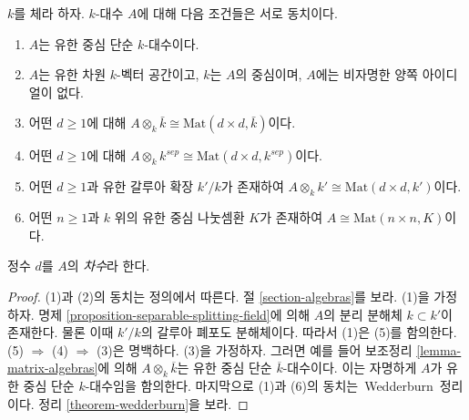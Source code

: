 \begin{lemma}
\label{lemma-finite-central-simple-algebra}
$k$를 체라 하자. $k$-대수 $A$에 대해 다음 조건들은 서로 동치이다.
\begin{enumerate}
\item $A$는 유한 중심 단순 $k$-대수이다.
\item $A$는 유한 차원 $k$-벡터 공간이고, $k$는 $A$의 중심이며,
$A$에는 비자명한 양쪽 아이디얼이 없다.
\item 어떤 $d \geq 1$에 대해
$A \otimes_k \bar k \cong \text{Mat}(d \times d, \bar k)$이다.
\item 어떤 $d \geq 1$에 대해
$A \otimes_k k^{sep} \cong \text{Mat}(d \times d, k^{sep})$이다.
\item 어떤 $d \geq 1$과 유한 갈루아 확장 $k'/k$가 존재하여
$A \otimes_k k' \cong \text{Mat}(d \times d, k')$이다.
\item 어떤 $n \geq 1$과 $k$ 위의 유한 중심 나눗셈환 $K$가 존재하여
$A \cong \text{Mat}(n \times n, K)$이다.
\end{enumerate}
정수 $d$를 $A$의 {\it 차수}라 한다.
\end{lemma}

\begin{proof}
(1)과 (2)의 동치는 정의에서 따른다. 절 \ref{section-algebras}를 보라.
(1)을 가정하자. 명제 \ref{proposition-separable-splitting-field}에 의해
$A$의 분리 분해체 $k \subset k'$이 존재한다. 물론 이때 $k'/k$의
갈루아 폐포도 분해체이다. 따라서 (1)은 (5)를 함의한다.
(5) $\Rightarrow$ (4) $\Rightarrow$ (3)은 명백하다. (3)을 가정하자.
그러면 예를 들어 보조정리 \ref{lemma-matrix-algebras}에 의해
$A \otimes_k \overline{k}$는 유한 중심 단순 $\overline{k}$-대수이다.
이는 자명하게 $A$가 유한 중심 단순 $k$-대수임을 함의한다.
마지막으로 (1)과 (6)의 동치는~Wedderburn~정리이다. 정리
\ref{theorem-wedderburn}을 보라.
\end{proof}
















